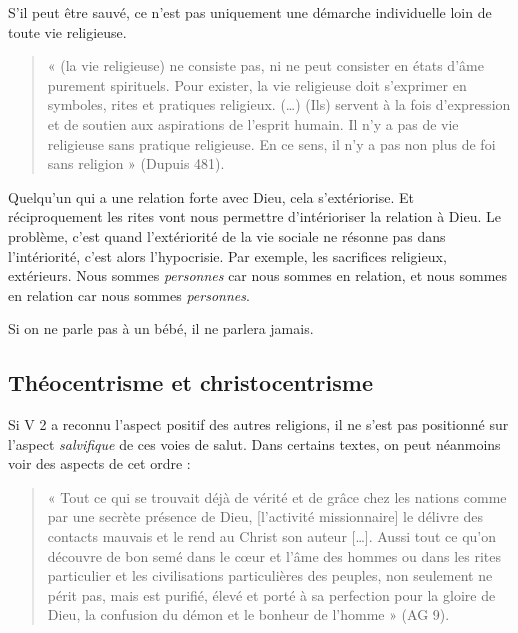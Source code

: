 S'il peut être sauvé, ce n'est pas uniquement une démarche individuelle loin de toute vie religieuse. 

\begin{quote}
    « (la vie religieuse) ne consiste pas, ni ne peut consister en états d’âme purement spirituels. Pour exister, la vie religieuse doit s’exprimer en symboles, rites et pratiques religieux. (…) (Ils) servent à la fois d’expression et de soutien aux aspirations de l’esprit humain. Il n’y a pas de vie religieuse sans pratique religieuse. En ce sens, il n’y a pas non plus de foi sans religion » (Dupuis 481).  
\end{quote}
Quelqu'un qui a une relation forte avec Dieu, cela s'extériorise. Et réciproquement les rites vont nous permettre d'intérioriser la relation à Dieu.
Le problème, c'est quand l'extériorité de la vie sociale ne résonne pas dans l'intériorité, c'est alors l'hypocrisie. Par exemple, les sacrifices religieux, extérieurs.
Nous sommes \textit{personnes} car nous sommes en relation, et nous sommes en relation car nous sommes \textit{personnes}.
\begin{Ex}
Si on ne parle pas à un bébé, il ne parlera jamais.
\end{Ex}

\subsection{Théocentrisme et christocentrisme }
 
 Si V 2 a reconnu l'aspect positif des autres religions, il ne s'est pas positionné sur l'aspect \textit{salvifique} de ces voies de salut. Dans certains textes, on peut néanmoins voir des aspects de cet ordre : 
 \begin{quote}
     « Tout ce qui se trouvait déjà de vérité et de grâce chez les nations comme par une secrète présence de Dieu, [l’activité missionnaire] le délivre des contacts mauvais et le rend au Christ son auteur […]. Aussi tout ce qu’on découvre de bon semé dans le cœur et l’âme des hommes ou dans les rites particulier et les civilisations particulières des peuples, non seulement ne périt pas, mais est purifié, élevé et porté à sa perfection pour la gloire de Dieu, la confusion du démon et le bonheur de l’homme » (AG 9). 
 \end{quote}
 

